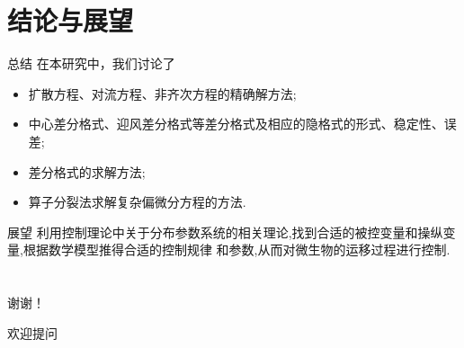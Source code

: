 \documentclass[xcolor=svgnames]{beamer} %
\newenvironment{fsitemize}{\begin{itemize}\fangsong}{\end{itemize}}   %
\begin{document}
\section{结论与展望}
\begin{frame}{总结}
在本研究中，我们讨论了
\begin{fsitemize}
\item 扩散方程、对流方程、非齐次方程的精确解方法;
\item 中心差分格式、迎风差分格式等差分格式及相应的隐格式的形式、稳定性、误差;
\item 差分格式的求解方法;
\item 算子分裂法求解复杂偏微分方程的方法.
\end{fsitemize}
\end{frame}
\begin{frame}{展望}
利用控制理论中关于分布参数系统的相关理论,找到合适的被控变量和操纵变量,根据数学模型推得合适的控制规律
和参数,从而对微生物的运移过程进行控制.
\end{frame}
	\section*{}
	\begin{frame}
	\begin{center}
	\Large
	谢谢！\par
	欢迎提问
	\end{center}
	\end{frame}
\end{document}
